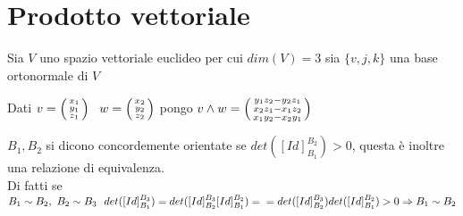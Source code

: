 \documentclass[12px]{article}
\begin{document}
	\section{Prodotto vettoriale}
		Sia $V$ uno spazio vettoriale euclideo per cui $dim(V) = 3$ sia $\{v,j,k\}$ una base ortonormale di $V$
		\begin{defi}
			Dati $v = \icol{x_1\\y_1\\z_1}\ \ w=\icol{x_2\\y_2\\z_2}$ pongo $v\wedge w = \left(\begin{smallmatrix}y_1z_2 - y_2z_1\\x_2z_1-x_1z_2\\x_1y_2-x_2y_1\end{smallmatrix}\right)$
		\end{defi}
		\begin{nota}
			$B_1,B_2$ si dicono concordemente orientate se $det([Id]^{B_2}_{B_1})>0$, questa è inoltre una relazione di equivalenza.\\
			Di fatti se $B_1\sim B_2, \ B_2\sim B_3\ \ det([Id]^{B_3}_{B_1})= det([Id]^{B_3}_{B_2}[Id]^{B_2}_{B_1})=\\ =det([Id]^{B_3}_{B_2})det([Id]^{B_2}_{B_1})>0 \Rightarrow B_1\sim B_2$
		\end{nota}
\end{document}
